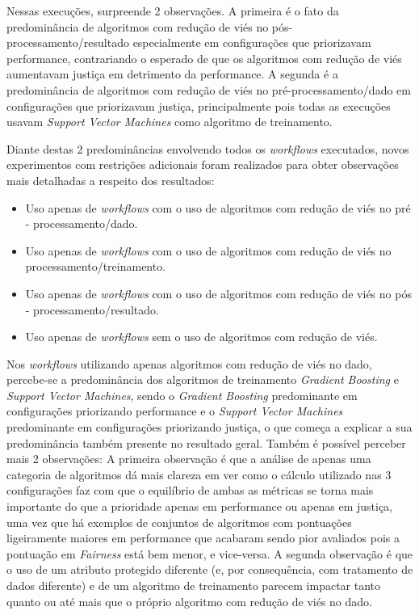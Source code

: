 \documentclass{article}
\begin{document}
Nessas execuções, surpreende 2 observações. A primeira é o fato da predominância de algoritmos com redução de viés no pós-processamento/resultado especialmente em configurações que priorizavam performance, contrariando o esperado de que os algoritmos com redução de viés aumentavam justiça em detrimento da performance. A segunda é a predominância de algoritmos com redução de viés no pré-processamento/dado em configurações que priorizavam justiça, principalmente pois todas as execuções usavam \textit{Support Vector Machines} como algoritmo de treinamento.

Diante destas 2 predominâncias envolvendo todos os \textit{workflows} executados, novos experimentos com restrições adicionais foram realizados para obter observações mais detalhadas a respeito dos resultados:

\begin{itemize}
\item Uso apenas de \textit{workflows} com o uso de algoritmos com redução de viés no pré - processamento/dado.
\item Uso apenas de \textit{workflows} com o uso de algoritmos com redução de viés no processamento/treinamento.
\item Uso apenas de \textit{workflows} com o uso de algoritmos com redução de viés no pós - processamento/resultado.
\item Uso apenas de \textit{workflows} sem o uso de algoritmos com redução de viés.
\end{itemize}

Nos \textit{workflows} utilizando apenas algoritmos com redução de viés no dado, percebe-se a predominância dos algoritmos de treinamento \textit{Gradient Boosting} e \textit{Support Vector Machines}, sendo o \textit{Gradient Boosting} predominante em configurações priorizando performance e o \textit{Support Vector Machines} predominante em configurações priorizando justiça, o que começa a explicar a sua predominância também presente no resultado geral. Também é possível perceber mais 2 observações: A primeira observação é que a análise de apenas uma categoria de algoritmos dá mais clareza em ver como o cálculo utilizado nas 3 configurações faz com que o equilíbrio de ambas as métricas se torna mais importante do que a prioridade apenas em performance ou apenas em justiça, uma vez que há exemplos de conjuntos de algoritmos com pontuações ligeiramente maiores em performance que acabaram sendo pior avaliados pois a pontuação em \textit{Fairness} está bem menor, e vice-versa. A segunda observação é que o uso de um atributo protegido diferente (e, por consequência, com tratamento de dados diferente) e de um algoritmo de treinamento parecem impactar tanto quanto ou até mais que o próprio algoritmo com redução de viés no dado.
\end{document}
